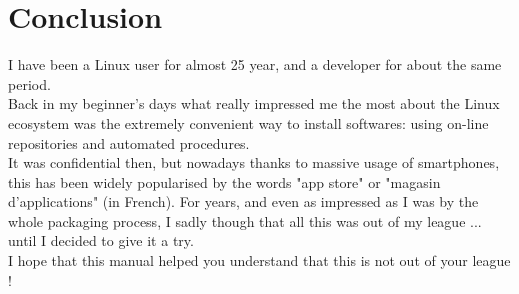 \documentclass{./these-seb}
\begin{document}





\chapter*{Conclusion}

I have been a Linux user for almost 25 year, and a developer for about the same period. \\ 
Back in my beginner's days what really impressed me the most about the Linux ecosystem was the extremely convenient 
way to install softwares: using on-line repositories and automated procedures. \\
It was confidential then, but nowadays thanks to massive usage of smartphones, this has been widely popularised by the words "app store" or "magasin d'applications" (in French). 
For years, and even as impressed as I was by the whole packaging process, I sadly though that all this was out of my league ... until I decided to give it a try.\\[0.25cm]
I hope that this manual helped you understand that this is not out of your league !

\appendix



\normalem

%
%

\end{document}
